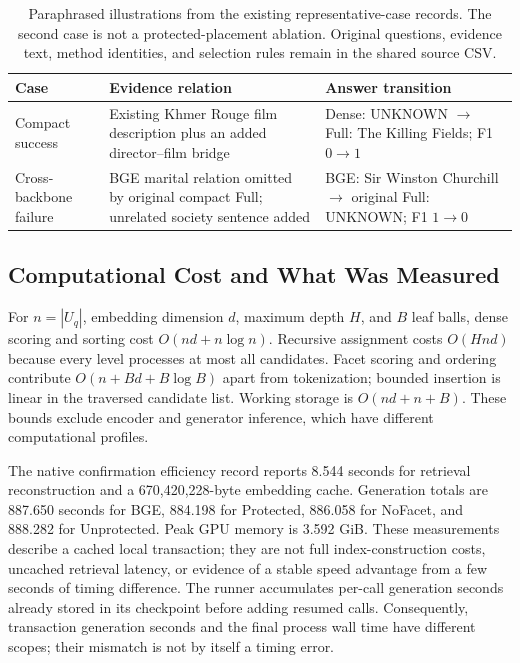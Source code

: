 \documentclass[11pt,a4paper]{article}
\begin{document}
\begin{table}[t]
\centering\small
\begin{tabular}{@{}p{}p{}p{}@{}}
\toprule
Case & Evidence relation & Answer transition\\
\midrule
Compact success & Existing Khmer Rouge film description plus an added
director--film bridge & Dense: UNKNOWN $\rightarrow$ Full: The Killing
Fields; F1 $0\rightarrow1$\\
Cross-backbone failure & BGE marital relation omitted by original compact
Full; unrelated society sentence added & BGE: Sir Winston Churchill
$\rightarrow$ original Full: UNKNOWN; F1 $1\rightarrow0$\\
\bottomrule
\end{tabular}
\caption{Paraphrased illustrations from the existing representative-case
records. The second case is not a protected-placement ablation. Original
questions, evidence text, method identities, and selection rules remain in
the shared source CSV.}
\label{tab:cases}
\end{table}

\subsection{Computational Cost and What Was Measured}
For $n=|U_q|$, embedding dimension $d$, maximum depth $H$, and $B$ leaf
balls, dense scoring and sorting cost $O(nd+n\log n)$. Recursive assignment
costs $O(Hnd)$ because every level processes at most all candidates.
Facet scoring and ordering contribute $O(n+Bd+B\log B)$ apart from
tokenization; bounded insertion is linear in the traversed candidate list.
Working storage is $O(nd+n+B)$. These bounds exclude encoder and generator
inference, which have different computational profiles.

The native confirmation efficiency record reports 8.544 seconds for retrieval
reconstruction and a 670,420,228-byte embedding cache. Generation totals are
887.650 seconds for BGE, 884.198 for Protected, 886.058 for NoFacet, and
888.282 for Unprotected. Peak GPU memory is 3.592 GiB. These measurements
describe a cached local transaction; they are not full index-construction
costs, uncached retrieval latency, or evidence of a stable speed advantage
from a few seconds of timing difference.
The runner accumulates per-call generation seconds already stored in its
checkpoint before adding resumed calls. Consequently, transaction generation
seconds and the final process wall time have different scopes; their mismatch
is not by itself a timing error.
\end{document}
